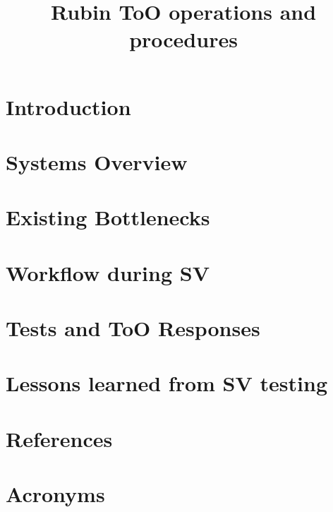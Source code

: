 \documentclass[OPS,lsstdraft,authoryear,toc]{lsstdoc}
\title{Rubin ToO operations and procedures}
\date{\vcsDate}
\begin{document}
\maketitle
\section{Introduction}\label{sec:introduction}

\newpage
\section{Systems Overview}\label{sec:sysOverview}

\newpage
\section{Existing Bottlenecks}\label{sec:existingBottlenecks}

\newpage
\section{Workflow during SV}\label{sec:workflow}

\newpage
\section{Tests and ToO Responses}\label{sec:ToOEvents}

\newpage
\section{Lessons learned from SV testing}\label{sec:LessonsLearned}


\appendix
\newpage
\section{References} \label{sec:bib}
\renewcommand{\refname}{} %


\newpage
\section{Acronyms} \label{sec:acronyms}

\end{document}
